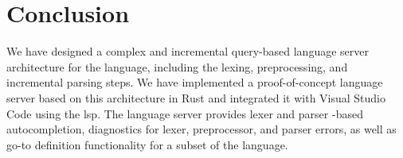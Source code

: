 \chapter*{Conclusion}

We have designed a complex and incremental query-based language server
architecture for the \pfs language, including the lexing, preprocessing, and
incremental parsing steps. We have implemented a proof-of-concept language
server based on this architecture in Rust and integrated it with Visual Studio
Code using the \acrlong{lsp}. The language server provides lexer and parser
-based autocompletion, diagnostics for lexer, preprocessor, and parser errors,
as well as go-to definition functionality for a subset of the \pfs language.


